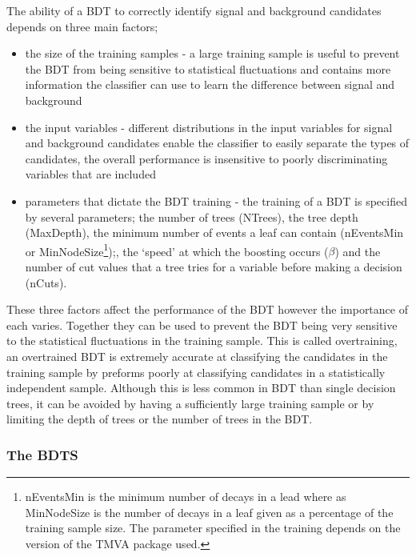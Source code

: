 The ability of a BDT to correctly identify signal and background candidates depends on three main factors;
\begin{itemize}
\item the size of the training samples - a large training sample is useful to prevent the BDT from being sensitive to statistical fluctuations and contains more information the classifier can use to learn the difference between signal and background
\item the input variables - different distributions in the input variables for signal and background candidates enable the classifier to easily separate the types of candidates, the overall performance is insensitive to poorly discriminating variables that are included
\item parameters that dictate the BDT training - the training of a BDT is specified by several parameters; the number of trees (NTrees), the tree depth (MaxDepth), the minimum number of events a leaf can contain (nEventsMin or MinNodeSize\footnote{nEventsMin is the minimum number of decays in a lead where as MinNodeSize is the number of decays in a leaf given as a percentage of the training sample size. The parameter specified in the training depends on the version of the TMVA package used. });, the `speed’ at which the boosting occurs ($\beta$) and the number of cut values that a tree tries for a variable before making a decision (nCuts).
\end{itemize}

These three factors affect the performance of the BDT however the importance of each varies. Together they can be used to prevent the BDT being very sensitive to the statistical fluctuations in the training sample. This  is called overtraining, an overtrained BDT is extremely accurate at classifying the candidates in the training sample by preforms poorly at classifying candidates in a statistically independent sample. Although this is less common in BDT than single decision trees, it can be avoided by having a sufficiently large training sample or by limiting the depth of trees or the number of trees in the BDT. 

\subsubsection{The BDTS}
\label{BDTS}

